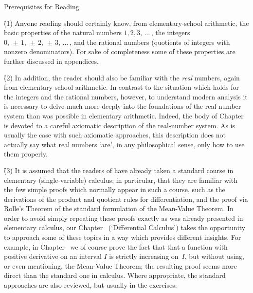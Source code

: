 \VV

       \h \underline{Prerequisites for Reading {\ThisText}}

\V

      \h \h (1) Anyone reading {\ThisText} should certainly know, from elementary-school arithmetic,
    the basic properties of the natural numbers $1, 2, 3, \,{\ldots}\,$, the integers $0,  \,{\pm}\, 1,  \,{\pm}\, 2,  \,{\pm}\, 3, \,{\ldots}\,$,
    and the rational numbers (quotients of integers with nonzero denominators). For sake of completeness some of these properties are further discussed in appendices.

\V

      \h \h (2) In addition, the reader should also be familiar with the {\em real} numbers, again from elementary-school arithmetic.
    In contrast to the situation which holds for the integers and the rational numbers, however, to understand modern analysis
    it is necessary to delve much more deeply into the foundations of the real-number system than was possible in elementary arithmetic.
    Indeed, the body of Chapter~ is devoted to a careful axiomatic description of the real-number system.
    As is usually the case with such axiomatic approaches, this description does not actually say what real numbers `are',
    in any philosophical sense, only how to use them properly.

\V

      \h \h (3) It is assumed that the readers of {\ThisText} have already taken a standard course in elementary (single-variable) calculus;
    in particular, that they are familiar with the few simple proofs which normally appear in such a course,
    such as the derivations of the product and quotient rules for differentiation, and the proof via Rolle's Theorem of the standard formulation of the Mean-Value Theorem.
    In order to avoid simply repeating these proofs exactly as was already presented in elementary calculus,
    our Chapter~ (`Differential Calculus')  takes the opportunity to approach some of these topics in a way which provides different insights.
    For example, in Chapter~ we of course prove the fact that that a function with positive derivative on an interval $I$ is strictly increasing on~$I$,
    but without using, or even mentioning, the Mean-Value Theorem; the resulting proof seems more direct than the standard one in calculus.
    Where appropriate, the standard approaches are also reviewed, but usually in the exercises.


